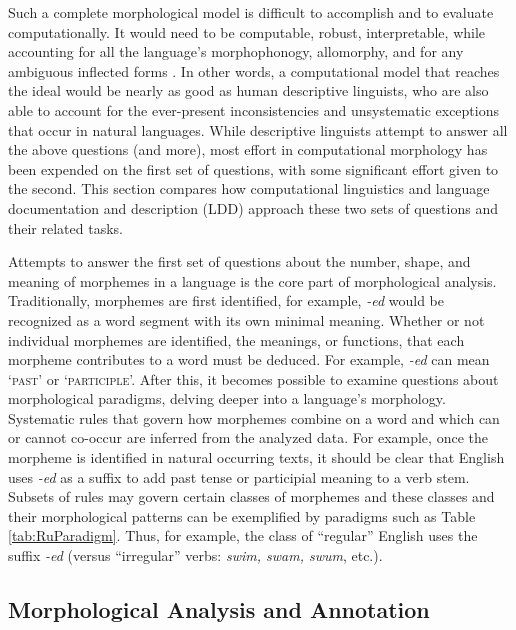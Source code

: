 \documentclass[12pt]{article}
\begin{document}
Such a complete morphological model is difficult to accomplish and to evaluate computationally. It would need to be computable, robust, interpretable, while accounting for all the language's morphophonogy, allomorphy, and for any ambiguous inflected forms \cite{virpioja_empirical_2011}. In other words, a computational model that reaches the ideal would be nearly as good as human descriptive linguists, who are also able to account for the ever-present inconsistencies and unsystematic exceptions that occur in natural languages. While descriptive linguists attempt to answer all the above questions (and more), most effort in computational morphology has been expended on the first set of questions, with some significant effort given to the second. This section compares how computational linguistics and language documentation and description (LDD) approach these two sets of questions and their related tasks.

Attempts to answer the first set of questions about the number, shape, and meaning of morphemes in a language is the core part of morphological analysis. Traditionally, morphemes are first identified, for example, \textit{-ed} would be recognized as a word segment with its own minimal meaning. Whether or not individual morphemes are identified, the meanings, or functions, that each morpheme contributes to a word must be deduced. For example, \textit{-ed} can mean `\textsc{past}' or `\textsc{participle}'. After this, it becomes possible to examine questions about morphological paradigms, delving deeper into a language's morphology. Systematic rules that govern how morphemes combine on a word and which can or cannot co-occur are inferred from the analyzed data. For example, once the morpheme is identified in natural occurring texts, it should be clear that English uses \textit{-ed} as a suffix to add past tense or participial meaning to a verb stem. Subsets of rules may govern certain classes of morphemes and these classes and their morphological patterns can be exemplified by paradigms such as Table \ref{tab:RuParadigm}. Thus, for example, the class of ``regular'' English uses the suffix \textit{-ed} (versus ``irregular'' verbs: \textit{swim, swam, swum}, etc.). 

\subsection{Morphological Analysis and Annotation}
\label{analysis}
\end{document}
